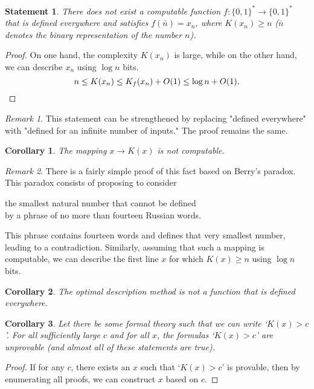 \documentclass[12pt,sans]{article}
\newcommand{\bits}{\{0,1\}}
\newcommand{\bitstr}{\bits^*}
\theoremstyle{definition}
\theoremstyle{plain}
\newtheorem{statement}{Statement}[section]
\newtheorem{corollary}{Corollary}[section]
\theoremstyle{remark}
\newtheorem{remark}{Remark}[section]
\begin{document}
\begin{statement}
    There does not exist a computable function $f:\bitstr\to\bitstr$ that is
    defined everywhere and satisfies $f(\bar n) = x_n$, where $K(x_n) \ge n$ ($\bar n$ denotes the binary representation of the number $n$).
\end{statement}
\begin{proof} On one hand, the complexity $K(x_n)$ is large, while on the other hand, we can describe $x_n$ using $\log n$ bits.
    \[
    n \le K(x_n) \le K_f(x_n) + O(1) \le \log n + O(1). \qedhere
    \]
\end{proof}

\begin{remark}
    This statement can be strengthened by replacing "defined everywhere" with "defined for an infinite number of inputs." The proof remains the same.
\end{remark}

\begin{corollary}
    The mapping $x \to K(x)$ is not computable.
\end{corollary}

\begin{remark}
    There is a fairly simple proof of this fact based on Berry's paradox. This paradox consists of proposing to consider
    \begin{center}
        the smallest natural number that cannot be defined\\ by a phrase of no more than fourteen Russian words.
    \end{center}
    This phrase contains fourteen words and defines that very smallest number, leading to a contradiction. Similarly, assuming that such a mapping is computable, we can describe the first line $x$ for which $K(x) \ge n$ using $\log n$ bits.
\end{remark}

\begin{corollary}
    The optimal description method is not a function that is defined everywhere.
\end{corollary}

\begin{corollary}
    Let there be some formal theory such that we can write `$K(x) > c$'. For all sufficiently large $c$ and for all $x$, the formulas `$K(x) > c$' are unprovable (and almost all of these statements are true).
\end{corollary}

\begin{proof}
    If for any $c$, there exists an $x$ such that `$K(x) > c$' is provable, then by enumerating all proofs, we can construct $x$ based on $c$.
\end{proof}
\end{document}
